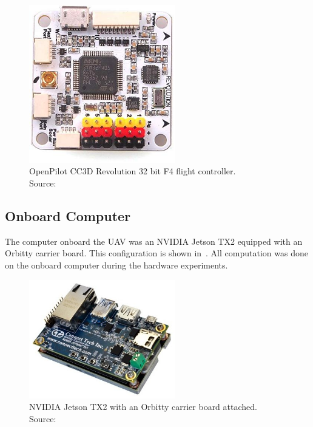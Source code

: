 \begin{figure}[htbp]
  \centering
  \includegraphics[width=2.5in]{figures/f4.jpg}
  \caption[OpenPilot CC3D Revolution 32 bit F4]{OpenPilot CC3D Revolution 32
    bit F4 flight controller. \\ \hspace{\textwidth} Source:~\cite{openpilotrevo}
}
%
  \label{fig:f4}
\end{figure}

\subsection{Onboard Computer}
The computer onboard the UAV was an NVIDIA Jetson TX2 equipped with an Orbitty
carrier board. This configuration is shown in~. All
computation was done on the onboard computer during the hardware experiments.

\begin{figure}[h]
  \centering
  \includegraphics[width=2.5in]{figures/tx2_orbitty.jpg}
  \caption[NVIDIA Jetson TX2 with Orbitty Carrier Board]{NVIDIA Jetson TX2
  with an Orbitty carrier board attached. \\\hspace{\textwidth} Source:~\cite{orbitty}
  }
  \label{fig:tx2_orbitty}
\end{figure}

